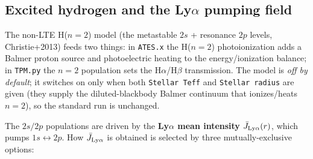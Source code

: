 \documentclass[english,a4paper]{kiseon_memo}
\begin{document}
\subsection{Excited hydrogen and the Ly$\alpha$ pumping field}
\label{sec:jlya}
The non-LTE H($n{=}2$) model (the metastable $2s$ + resonance $2p$ levels,
Christie+2013) feeds two things: in \texttt{ATES.x} the H($n{=}2$)
photoionization adds a Balmer proton source and photoelectric heating to the
energy/ionization balance; in \texttt{TPM.py} the $n{=}2$ population sets the
H$\alpha$/H$\beta$ transmission. The model is \emph{off by default}; it switches
on only when both \texttt{Stellar Teff} and \texttt{Stellar radius} are given (they
supply the diluted-blackbody Balmer continuum that ionizes/heats $n{=}2$), so the
standard run is unchanged.

The $2s/2p$ populations are driven by the \textbf{Ly$\alpha$ mean intensity}
$\bar J_{\rm Ly\alpha}(r)$, which pumps $1s\!\leftrightarrow\!2p$. How
$\bar J_{\rm Ly\alpha}$ is obtained is selected by three mutually-exclusive
options:
\end{document}
